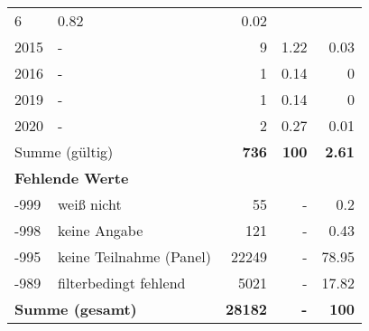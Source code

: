 \begin{longtable}{lXrrr}
       \num{6} &
       \num[round-mode=places,round-precision=2]{0.82} &
         \num[round-mode=places,round-precision=2]{0.02} \\

     2015 &
     \multicolumn{1}{X}{ -  } &


       \num{9} &
       \num[round-mode=places,round-precision=2]{1.22} &
         \num[round-mode=places,round-precision=2]{0.03} \\

     2016 &
     \multicolumn{1}{X}{ -  } &


       \num{1} &
       \num[round-mode=places,round-precision=2]{0.14} &
         \num[round-mode=places,round-precision=2]{0} \\

     2019 &
     \multicolumn{1}{X}{ -  } &


       \num{1} &
       \num[round-mode=places,round-precision=2]{0.14} &
         \num[round-mode=places,round-precision=2]{0} \\

     2020 &
     \multicolumn{1}{X}{ -  } &


       \num{2} &
       \num[round-mode=places,round-precision=2]{0.27} &
         \num[round-mode=places,round-precision=2]{0.01} \\
     \midrule
     \multicolumn{2}{l}{Summe (gültig)} &
       \textbf{\num{736}} &
     \textbf{\num{100}} &
       \textbf{\num[round-mode=places,round-precision=2]{2.61}} \\
     \multicolumn{5}{l}{\textbf{Fehlende Werte}}\\
       -999 &
       weiß nicht &
         \num{55} &
        - &
         \num[round-mode=places,round-precision=2]{0.2} \\
       -998 &
       keine Angabe &
         \num{121} &
        - &
         \num[round-mode=places,round-precision=2]{0.43} \\
       -995 &
       keine Teilnahme (Panel) &
         \num{22249} &
        - &
         \num[round-mode=places,round-precision=2]{78.95} \\
       -989 &
       filterbedingt fehlend &
         \num{5021} &
        - &
         \num[round-mode=places,round-precision=2]{17.82} \\
     \midrule
     \multicolumn{2}{l}{\textbf{Summe (gesamt)}} &
          \textbf{\num{28182}} &
        \textbf{-} &
        \textbf{\num{100}} \\
     \bottomrule
     \end{longtable}
     
